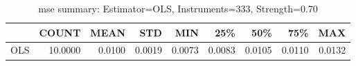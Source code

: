 \begin{table}[ht]
\centering
\caption{mse summary: Estimator=OLS, Instruments=333, Strength=0.70}
\begin{tabular}{lrrrrrrrr}
\toprule
 & COUNT & MEAN & STD & MIN & 25\% & 50\% & 75\% & MAX \\
\midrule
OLS & 10.0000 & 0.0100 & 0.0019 & 0.0073 & 0.0083 & 0.0105 & 0.0110 & 0.0132 \\
\bottomrule
\end{tabular}
\end{table}

